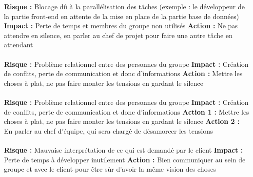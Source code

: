 \textbf{Risque : } Blocage dû à la parallélisation des tâches (exemple : le développeur de la partie
front-end en attente de la mise en place de la partie base de données)
\newline
\textbf{Impact : } Perte de temps et membres du groupe non utilisés
\newline
\textbf{Action : } Ne pas attendre en silence, en parler au chef de projet pour faire une autre tâche
en attendant

\paragraph{}

\textbf{Risque : } Problème relationnel entre des personnes du groupe
\newline
\textbf{Impact : } Création de conflits, perte de communication et donc d’informations
\newline
\textbf{Action : } Mettre les choses à plat, ne pas faire monter les tensions en gardant le silence

\paragraph{}

\textbf{Risque : } Problème relationnel entre des personnes du groupe
\newline
\textbf{Impact : } Création de conflits, perte de communication et donc d’informations
\newline
\textbf{Action 1 : } Mettre les choses à plat, ne pas faire monter les tensions en gardant le silence
\newline
\textbf{Action 2 : } En parler au chef d’équipe, qui sera chargé de désamorcer les tensions

\paragraph{}

\textbf{Risque : } Mauvaise interprétation de ce qui est demandé par le client
\newline
\textbf{Impact : } Perte de temps à développer inutilement
\newline
\textbf{Action : } Bien communiquer au sein de groupe et avec le client pour être sûr d’avoir la même vision des choses













